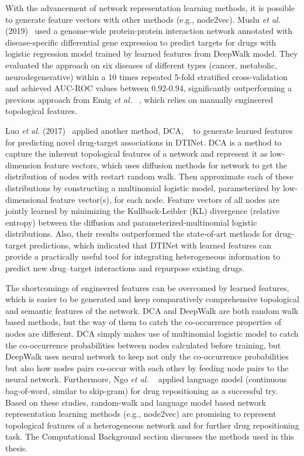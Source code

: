 With the advancement of network representation learning methods, it is possible to generate feature vectors with other methods (e.g., node2vec). Muslu \textit{et al.} (2019)~\cite{muslu_guiltytargets:_2019} used a genome-wide protein-protein interaction network annotated with disease-specific differential gene expression to predict targets for drugs with logistic regression model trained by learned features from DeepWalk model. They evaluated the approach on six diseases of different types (cancer, metabolic, neurodegenerative) within a 10 times repeated 5-fold stratified cross-validation and achieved AUC-ROC values between 0.92-0.94, significantly outperforming a previous approach from Emig \textit{et al.} ~\cite{emig_drug_2013}, which relies on manually engineered topological features.

Luo \textit{et al.} (2017)~\cite{luo_network_2017} applied another method, \ac{DCA}, ~\cite{cho_diffusion_2015} to generate learned features for predicting novel drug-target associations in DTINet. \ac{DCA} is a method to capture the inherent topological features of a network and represent it as low-dimension feature vectors, which uses diffusion methods for network to get the distribution of nodes with restart random walk. Then approximate each of these distributions by constructing a multinomial logistic model, parameterized by low-dimensional feature vector(s), for each node. Feature vectors of all nodes are jointly learned by minimizing the Kullback-Leibler (KL) divergence (relative entropy) between the diffusion and parameterized-multinomial logistic distributions. Also, their results outperformed the state-of-art methods for drug-target predictions, which indicated that DTINet with learned features can provide a practically useful tool for integrating heterogeneous information to predict new drug–target interactions and repurpose existing drugs.

The shortcomings of engineered features can be overcomed by learned features, which is easier to be generated and keep comparatively comprehensive topological and semantic features of the network. \ac{DCA} and DeepWalk are both random walk based methods, but the way of them to catch the co-occurrence properties of nodes are different. \ac{DCA} simply makes use of multinomial logistic model to catch the co-occurrence probabilities between nodes calculated before training, but DeepWalk uses neural network to keep not only the co-occurrence probabilities but also how nodes pairs co-occur with each other by feeding node pairs to the neural network. Furthermore, Ngo \textit{et al.} ~\cite{wu_increase_2016} applied language model (continuous bag-of-word, similar to skip-gram) for drug repositioning as a successful try. Based on these studies, random-walk and language model based network representation learning methods (e.g., node2vec) are promising to represent topological features of a heterogeneous network and for further drug repositioning task. The Computational Background section discusses the methods used in this thesis.
